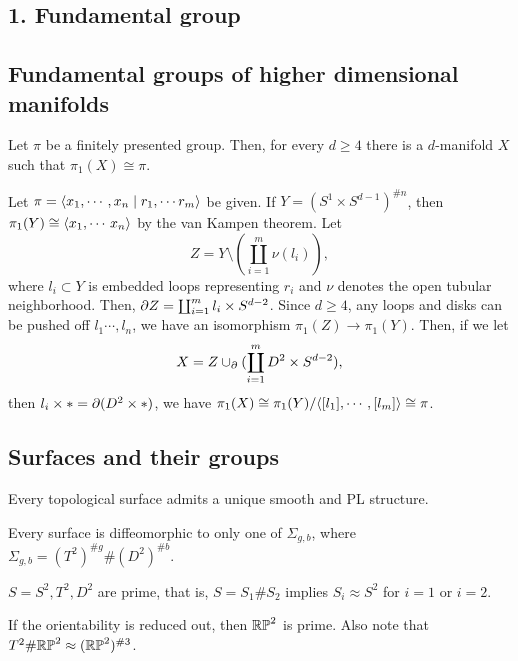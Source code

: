 \documentclass{../../small}
\begin{document}
\subsection*{1. Fundamental group}
\subsection{Fundamental groups of higher dimensional manifolds}
\begin{prop}
Let $\pi$ be a finitely presented group.
Then, for every $d\ge4$ there is a $d$-manifold $X$ such that $\pi_1(X)\cong\pi$.
\end{prop}
\begin{pf}
Let $\pi=\langle x_1,\cdots,x_n\mid r_1,\cdots r_m\rangle$ be given.
If $Y=(S^1\times S^{d-1})^{\#n}$, then $\pi_1(Y)\cong\langle x_1,\cdots\,x_n\rangle$ by the van Kampen theorem.
Let
\[Z=Y\setminus(\coprod_{i=1}^m\nu(l_i)),\]
where $l_i\subset Y$ is embedded loops representing $r_i$ and $\nu$ denotes the open tubular neighborhood.
Then, $\pd Z=\coprod_{i=1}^ml_i\times S^{d-2}$.
Since $d\ge4$, any loops and disks can be pushed off $l_1\cdots,l_n$, we have an isomorphism $\pi_1(Z)\to\pi_1(Y)$.
Then, if we let
\[X=Z\cup_{\pd}(\coprod_{i=1}^mD^2\times S^{d-2}),\] then $l_i\times*=\pd(D^2\times*)$, we have $\pi_1(X)\cong\pi_1(Y)/\langle[l_1],\cdots,[l_m]\rangle\cong\pi$.
\end{pf}

\subsection{Surfaces and their groups}

\begin{thm}
Every topological surface admits a unique smooth and PL structure.
\end{thm}

\begin{thm}
Every surface is diffeomorphic to only one of $\Sigma_{g,b}$, where $\Sigma_{g,b}=(T^2)^{\#g}\#(D^2)^{\#b}$.
\end{thm}

\begin{cor}
$S=S^2,T^2,D^2$ are prime, that is, $S=S_1\#S_2$ implies $S_i\approx S^2$ for $i=1$ or $i=2$.
\end{cor}

\begin{rmk}
If the orientability is reduced out, then $\mathbb{RP}^2$ is prime.
Also note that $T^2\#\mathbb{RP}^2\approx(\mathbb{RP}^2)^{\#3}$.
\end{rmk}
\end{document}
